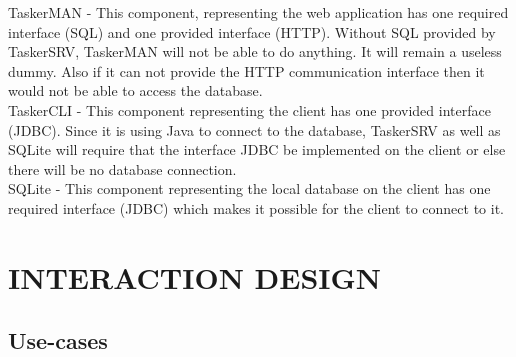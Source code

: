 \documentclass{project}
\begin{document}
TaskerMAN - This component, representing the web application has one required interface (SQL) and one provided interface (HTTP). Without SQL provided by TaskerSRV, TaskerMAN will not be able to do anything. It will remain a useless dummy. Also if it can not provide the HTTP communication interface then it would not be able to access the database. \\
\newline 
TaskerCLI - This component representing the client has one provided interface (JDBC). Since it is using Java to connect to the database, TaskerSRV as well as SQLite will require that the interface JDBC be implemented on the client or else there will be no database connection. \\
\newline SQLite - This component representing the local database on the client has one required interface (JDBC) which makes it possible for the client to connect to it.
\section{INTERACTION DESIGN}
\subsection{Use-cases}
\end{document}
